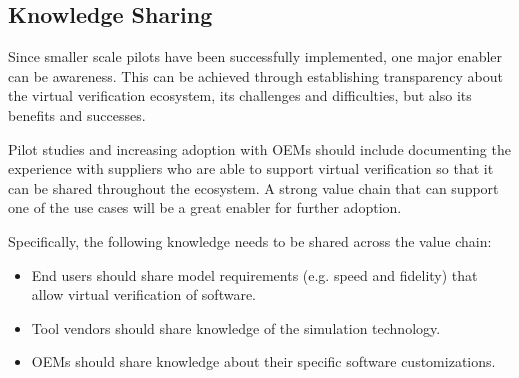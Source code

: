 
\subsection{Knowledge Sharing}
Since smaller scale pilots have been successfully implemented, one major enabler can be awareness. This can be achieved through establishing transparency about the virtual verification ecosystem, its challenges and difficulties, but also its benefits and successes. 

Pilot studies and increasing adoption with OEMs should include documenting the experience with suppliers who are able to support virtual verification so that it can be shared throughout the ecosystem. A strong value chain that can support one of the use cases will be a great enabler for further adoption.

Specifically, the following knowledge needs to be shared across the value chain:
\begin{itemize}
  \item End users should share model requirements (e.g. speed and fidelity) that allow virtual verification of software.
  \item Tool vendors should share knowledge of the simulation technology.
  \item OEMs should share knowledge about their specific software customizations.
\end{itemize}


